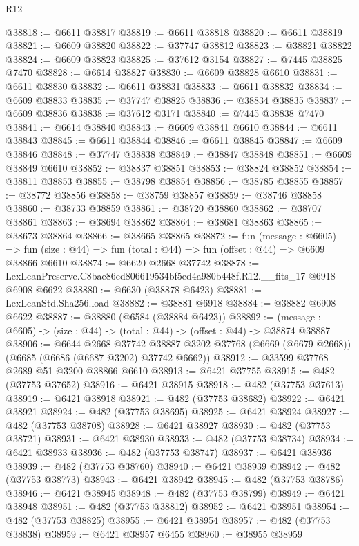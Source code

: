 \begin{lexlean}{R12}
\begin{coremodule}
@38818 := @6611 @38817
@38819 := @6611 @38818
@38820 := @6611 @38819
@38821 := @6609 @38820
@38822 := @37747 @38812
@38823 := @38821 @38822
@38824 := @6609 @38823
@38825 := @37612 @3154
@38827 := @7445 @38825 @7470
@38828 := @6614 @38827
@38830 := @6609 @38828 @6610
@38831 := @6611 @38830
@38832 := @6611 @38831
@38833 := @6611 @38832
@38834 := @6609 @38833
@38835 := @37747 @38825
@38836 := @38834 @38835
@38837 := @6609 @38836
@38838 := @37612 @3171
@38840 := @7445 @38838 @7470
@38841 := @6614 @38840
@38843 := @6609 @38841 @6610
@38844 := @6611 @38843
@38845 := @6611 @38844
@38846 := @6611 @38845
@38847 := @6609 @38846
@38848 := @37747 @38838
@38849 := @38847 @38848
@38851 := @6609 @38849 @6610
@38852 := @38837 @38851
@38853 := @38824 @38852
@38854 := @38811 @38853
@38855 := @38798 @38854
@38856 := @38785 @38855
@38857 := @38772 @38856
@38858 := @38759 @38857
@38859 := @38746 @38858
@38860 := @38733 @38859
@38861 := @38720 @38860
@38862 := @38707 @38861
@38863 := @38694 @38862
@38864 := @38681 @38863
@38865 := @38673 @38864
@38866 := @38665 @38865
@38872 := fun (message : @6605) =>
  fun (size : @44) => fun (total : @44) => fun (offset : @44) => @6609 @38866 @6610
@38874 := @6620 @2668 @37742
@38878 := LexLeanPreserve.C8bae86ed806619534bf5ed4a980b448f.R12.__fits_17 @6918 @6908 @6622
@38880 := @6630 (@38878 @6423)
@38881 := LexLeanStd.Sha256.load
@38882 := @38881 @6918
@38884 := @38882 @6908 @6622
@38887 := @38880 (@6584 (@38884 @6423))
@38892 := (message : @6605) -> (size : @44) -> (total : @44) -> (offset : @44) -> @38874 @38887
@38906 := @6644
    @2668
    @37742
    @38887
    @3202
    @37768
    (@6669 (@6679 @2668))
    (@6685 (@6686 (@6687 @3202) @37742 @6662))
@38912 := @33599 @37768 @2689 @51 @3200 @38866 @6610
@38913 := @6421 @37755
@38915 := @482 (@37753 @37652)
@38916 := @6421 @38915
@38918 := @482 (@37753 @37613)
@38919 := @6421 @38918
@38921 := @482 (@37753 @38682)
@38922 := @6421 @38921
@38924 := @482 (@37753 @38695)
@38925 := @6421 @38924
@38927 := @482 (@37753 @38708)
@38928 := @6421 @38927
@38930 := @482 (@37753 @38721)
@38931 := @6421 @38930
@38933 := @482 (@37753 @38734)
@38934 := @6421 @38933
@38936 := @482 (@37753 @38747)
@38937 := @6421 @38936
@38939 := @482 (@37753 @38760)
@38940 := @6421 @38939
@38942 := @482 (@37753 @38773)
@38943 := @6421 @38942
@38945 := @482 (@37753 @38786)
@38946 := @6421 @38945
@38948 := @482 (@37753 @38799)
@38949 := @6421 @38948
@38951 := @482 (@37753 @38812)
@38952 := @6421 @38951
@38954 := @482 (@37753 @38825)
@38955 := @6421 @38954
@38957 := @482 (@37753 @38838)
@38959 := @6421 @38957 @6455
@38960 := @38955 @38959

\end{coremodule}
\end{lexlean}
